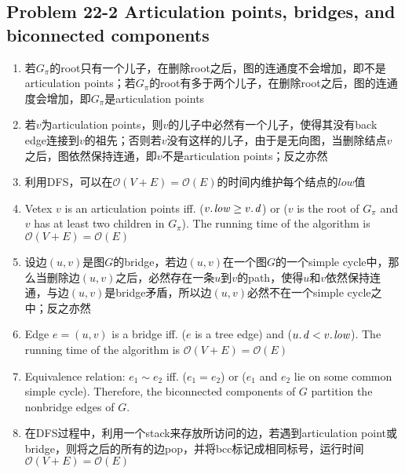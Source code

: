 \subsection*{Problem 22-2 Articulation points, bridges, and biconnected components}
\begin{enumerate}
	\item	若$G_{\pi}$的root只有一个儿子，在删除root之后，图的连通度不会增加，即不是articulation points；若$G_{\pi}$的root有多于两个儿子，在删除root之后，图的连通度会增加，即$G_{\pi}$是articulation points
	\item	若$v$为articulation points，则$v$的儿子中必然有一个儿子，使得其没有back edge连接到$v$的祖先；否则若$v$没有这样的儿子，由于是无向图，当删除结点$v$之后，图依然保持连通，即$v$不是articulation points；反之亦然
	\item	利用DFS，可以在$\mathcal{O}(V + E) = \mathcal{O}(E)$的时间内维护每个结点的$low$值
	\item	Vetex $v$ is an articulation points iff. ($\attrib{v}{low} \geq \attrib{v}{d}$) or ($v$ is the root of $G_{\pi}$ and $v$ has at least two children in $G_{\pi}$). The running time of the algorithm is $\mathcal{O}(V + E) = \mathcal{O}(E)$
	\item	设边$(u, v)$是图$G$的bridge，若边$(u, v)$在一个图$G$的一个simple cycle中，那么当删除边$(u, v)$之后，必然存在一条$u$到$v$的path，使得$u$和$v$依然保持连通，与边$(u, v)$是bridge矛盾，所以边$(u, v)$必然不在一个simple cycle之中；反之亦然
	\item	Edge $e = (u, v)$ is a bridge iff. ($e$ is a tree edge) and ($\attrib{u}{d} < \attrib{v}{low}$). The running time of the algorithm is $\mathcal{O}(V + E) = \mathcal{O}(E)$
	\item	Equivalence relation: $e_1 \sim e_2$ iff. ($e_1 = e_2$) or ($e_1$ and $e_2$ lie on some common simple cycle). Therefore, the biconnected components of $G$ partition the nonbridge edges of $G$.
	\item	在DFS过程中，利用一个stack来存放所访问的边，若遇到articulation point或bridge，则将之后的所有的边pop，并将bcc标记成相同标号，运行时间$\mathcal{O}(V + E) = \mathcal{O}(E)$
\end{enumerate}


